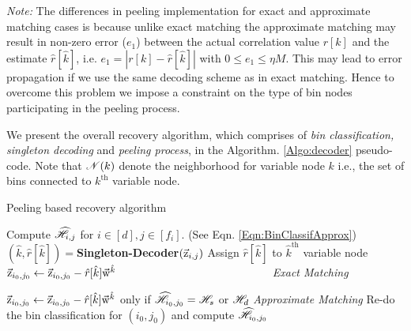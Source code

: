 {\it Note:} The differences in peeling implementation for exact and approximate matching cases is because unlike exact matching the approximate matching may result in non-zero error ($e_1$) between the actual correlation value $r[k]$ and the estimate $\hat{r}[\hat{k}]$, i.e. $e_1 = |r[k]- \hat{r}[\hat{k}]|$ with $0 \leq e_1 \leq \eta M$. This may lead to error propagation if we use the same decoding scheme as in exact matching. Hence to overcome this problem we impose a constraint on the type of bin nodes participating in the peeling process.
	
We present the overall recovery algorithm, which comprises of {\it bin classification, singleton decoding} and {\it peeling process}, in the Algorithm. \ref{Algo:decoder} pseudo-code. Note that $\mathscr{N}(k)$ denote the neighborhood for variable node $k$  i.e., the set of bins connected to $k^{\text{th}}$ variable node.

\def\gap{4pt}
\begin{algorithm}[h!]
\caption{Peeling based recovery algorithm}
\label{Algo:decoder}
\begin{algorithmic}
\State Compute $\widehat{\mathscr{H}}_{i,j}$ for $i\in[d], j\in[f_i]$. (See Eqn. \eqref{Eqn:BinClassifApprox})
\vspace{\gap}
\vspace{\gap}
  \State $(\hat{k},\hat{r}[\hat{k}])=${\bf Singleton-Decoder}$(\vec{\mathrm{z}}_{i,j})$
\vspace{\gap}
  \State Assign $\hat{r}[\hat{k}]$ to $\hat{k}^{\text{th}}$ variable node
\vspace{1.5\gap}
\vspace{\gap}
	   \State $\zv_{i_0,j_0}\gets\zv_{i_0,j_0}-\hat{r}[\hat{k}]\wv^{\hat{k}} \hspace{32.0 ex}$
	   \hspace{45.5ex} {\it Exact Matching}
	   \vspace{\gap}

        \State $\vec{\mathrm{z}}_{i_0,j_0}\gets\vec{\mathrm{z}}_{i_0,j_0}-\hat{r}[\hat{k}]\vec{\mathrm{w}}^{\hat{k}}$   \hspace{6ex} only if $\widehat{\mathscr{H}}_{i_0,j_0}=\mathscr{H}_s$ or $\mathscr{H}_d$ 	   
        \hspace{14ex} {\it Approximate Matching}
	   \vspace{\gap}
	   \State Re-do the bin classification for $(i_0,j_0)$ and compute $\widehat{\mathscr{H}}_{i_0,j_0}$
      \EndFor
\EndWhile
\end{algorithmic}
\end{algorithm}


